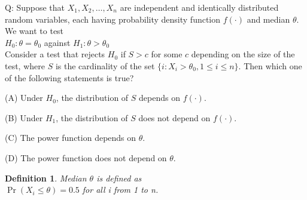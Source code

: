 \documentclass[journal,12pt,onecolumn]{IEEEtran}
\newtheorem{definition}[problem]{Definition}
\theoremstyle{remark}
\begin{document}
\let\vec\mathbf




\vspace{3cm}



\bigskip

\renewcommand{\thefigure}{\theenumi}
\renewcommand{\thetable}{\theenumi}
Q: Suppose that $X_1, X_2, \ldots, X_n$ are independent and identically distributed random variables, each having probability density function $f(\cdot)$ and median $\theta$. We want to test\\
$H_0: \theta = \theta_0$ against $H_1: \theta > \theta_0$\\
Consider a test that rejects $H_0$ if $S > c$ for some $c$ depending on the size of the test, where $S$ is the cardinality of the set $\{i : X_i > \theta_0, 1 \leq i \leq n\}$. Then which one of the following statements is true?

(A) Under $H_0$, the distribution of $S$ depends on $f(\cdot)$.

(B) Under $H_1$, the distribution of $S$ does not depend on $f(\cdot)$.

(C) The power function depends on $\theta$.

(D) The power function does not depend on $\theta$.
\\ \solution
\begin{definition}
Median \(\theta\) is defined as\\
\centering
\(\Pr(X_i \leq \theta) = 0.5\) for all i from 1 to n.
\end{definition}
\end{document}
